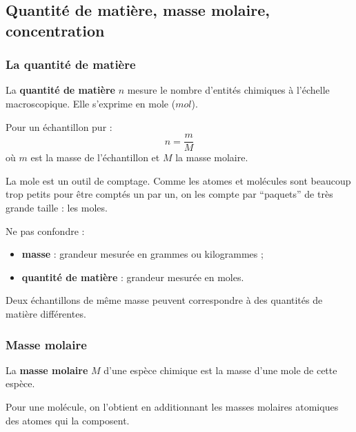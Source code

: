 \documentclass[11pt,a4paper]{article}
\begin{document}
\subsection{Quantité de matière, masse molaire, concentration}

\subsubsection{La quantité de matière}

\begin{definitionbox}
La \textbf{quantité de matière} \(n\) mesure le nombre d'entités chimiques à l'échelle macroscopique.  
Elle s'exprime en mole (\(\si{mol}\)).
\end{definitionbox}

\begin{proprbox}
Pour un échantillon pur :
\[
n=\frac{m}{M}
\]
où \(m\) est la masse de l'échantillon et \(M\) la masse molaire.
\end{proprbox}

\begin{sensbox}
La mole est un outil de comptage.  
Comme les atomes et molécules sont beaucoup trop petits pour être comptés un par un, on les compte par ``paquets'' de très grande taille : les moles.
\end{sensbox}

\begin{attentionbox}
Ne pas confondre :
\begin{itemize}
    \item \textbf{masse} : grandeur mesurée en grammes ou kilogrammes ;
    \item \textbf{quantité de matière} : grandeur mesurée en moles.
\end{itemize}
Deux échantillons de même masse peuvent correspondre à des quantités de matière différentes.
\end{attentionbox}

\subsubsection{Masse molaire}

\begin{definitionbox}
La \textbf{masse molaire} \(M\) d'une espèce chimique est la masse d'une mole de cette espèce.
\end{definitionbox}

Pour une molécule, on l'obtient en additionnant les masses molaires atomiques des atomes qui la composent.
\end{document}
